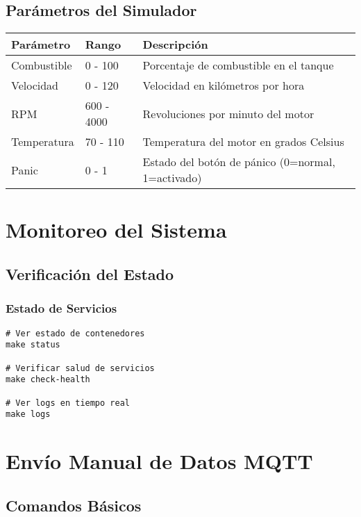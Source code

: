 \subsection{Parámetros del Simulador}

\begin{table}[H]
\centering
\begin{tabular}{|l|l|p{6cm}|}
\hline
\textbf{Parámetro} & \textbf{Rango} & \textbf{Descripción} \\
\hline
Combustible & 0 - 100 & Porcentaje de combustible en el tanque \\
\hline
Velocidad & 0 - 120 & Velocidad en kilómetros por hora \\
\hline
RPM & 600 - 4000 & Revoluciones por minuto del motor \\
\hline
Temperatura & 70 - 110 & Temperatura del motor en grados Celsius \\
\hline
Panic & 0 - 1 & Estado del botón de pánico (0=normal, 1=activado) \\
\hline
\end{tabular}
\end{table}

\section{Monitoreo del Sistema}

\subsection{Verificación del Estado}

\subsubsection{Estado de Servicios}
\begin{verbatim}
# Ver estado de contenedores
make status

# Verificar salud de servicios
make check-health

# Ver logs en tiempo real
make logs
\end{verbatim}

\section{Envío Manual de Datos MQTT}

\subsection{Comandos Básicos}

